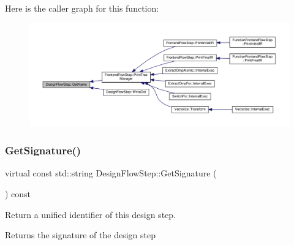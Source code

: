 Here is the caller graph for this function\+:
\nopagebreak
\begin{figure}[H]
\begin{center}
\leavevmode
\includegraphics[width=350pt]{d3/da9/classDesignFlowStep_a01e5ebfab88db3b3b7f832f80075fad8_icgraph}
\end{center}
\end{figure}
\mbox{\label{classDesignFlowStep_ab111e3d4058615c2dedc0505978d4699}} 
\subsubsection{\texorpdfstring{Get\+Signature()}{GetSignature()}}
{\footnotesize\ttfamily virtual const std\+::string Design\+Flow\+Step\+::\+Get\+Signature (\begin{DoxyParamCaption}{ }\end{DoxyParamCaption}) const\hspace{0.3cm}{\ttfamily [pure virtual]}}



Return a unified identifier of this design step. 

\begin{DoxyReturn}{Returns}
the signature of the design step 
\end{DoxyReturn}


